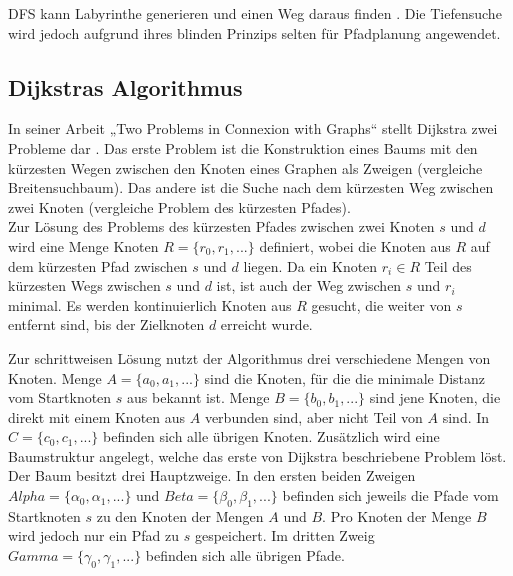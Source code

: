 DFS kann Labyrinthe generieren und einen Weg daraus finden \cite{KB15}. Die Tiefensuche wird jedoch aufgrund ihres blinden Prinzips selten für Pfadplanung angewendet.


\subsection{Dijkstras Algorithmus}
In seiner Arbeit „Two Problems in Connexion with Graphs“ stellt Dijkstra zwei Probleme dar \cite{Dijkstra.1959}. Das erste Problem ist die Konstruktion eines Baums mit den kürzesten Wegen zwischen den Knoten eines Graphen als Zweigen (vergleiche Breitensuchbaum). Das andere ist die Suche nach dem kürzesten Weg zwischen zwei Knoten (vergleiche Problem des kürzesten Pfades). \\
Zur Lösung des Problems des kürzesten Pfades zwischen zwei Knoten $s$ und $d$ wird eine Menge Knoten $R = \{r_0, r_1, ...\}$ definiert, wobei die Knoten aus $R$ auf dem kürzesten Pfad zwischen $s$ und $d$ liegen. Da ein Knoten $r_i \in R$ Teil des kürzesten Wegs zwischen $s$ und $d$ ist, ist auch der Weg zwischen $s$ und $r_i$ minimal. Es werden kontinuierlich Knoten aus $R$ gesucht, die weiter von $s$ entfernt sind, bis der Zielknoten $d$ erreicht wurde.

Zur schrittweisen Lösung nutzt der Algorithmus drei verschiedene Mengen von Knoten. Menge $A = \{a_0, a_1, ...\}$ sind die Knoten, für die die minimale Distanz vom Startknoten $s$ aus bekannt ist. Menge $B = \{b_0, b_1, ...\}$ sind jene Knoten, die direkt mit einem Knoten aus $A$ verbunden sind, aber nicht Teil von $A$ sind. In $C = \{c_0, c_1, ...\}$ befinden sich alle übrigen Knoten.
Zusätzlich wird eine Baumstruktur angelegt, welche das erste von Dijkstra beschriebene Problem löst. Der Baum besitzt drei Hauptzweige. In den ersten beiden Zweigen $Alpha = \{\alpha_0, \alpha_1, ...\}$ und $Beta = \{\beta_0, \beta_1, ...\}$ befinden sich jeweils die Pfade vom Startknoten $s$ zu den Knoten der Mengen $A$ und $B$. Pro Knoten der Menge $B$ wird jedoch nur ein Pfad zu $s$ gespeichert. Im dritten Zweig $Gamma = \{\gamma_0, \gamma_1, ...\}$ befinden sich alle übrigen Pfade.


